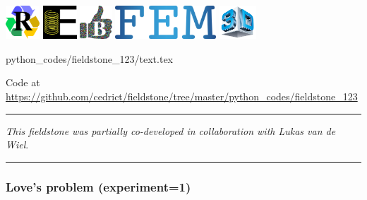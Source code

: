 \includegraphics[height=1.25cm]{images/pictograms/replication}
\includegraphics[height=1.25cm]{images/pictograms/elasticity}
\includegraphics[height=1.25cm]{images/pictograms/benchmark}
\includegraphics[height=1.25cm]{images/pictograms/FEM}
\includegraphics[height=1.25cm]{images/pictograms/3d}

\begin{flushright} {\tiny {\color{gray} python\_codes/fieldstone\_123/text.tex}} \end{flushright}



\begin{center}

Code at \url{https://github.com/cedrict/fieldstone/tree/master/python_codes/fieldstone_123}
\end{center}

\par\noindent\rule{\textwidth}{0.4pt}

{\sl This fieldstone was partially co-developed in collaboration with Lukas van de Wiel}. 

\par\noindent\rule{\textwidth}{0.4pt}

\subsubsection*{Love's problem (experiment=1)}


